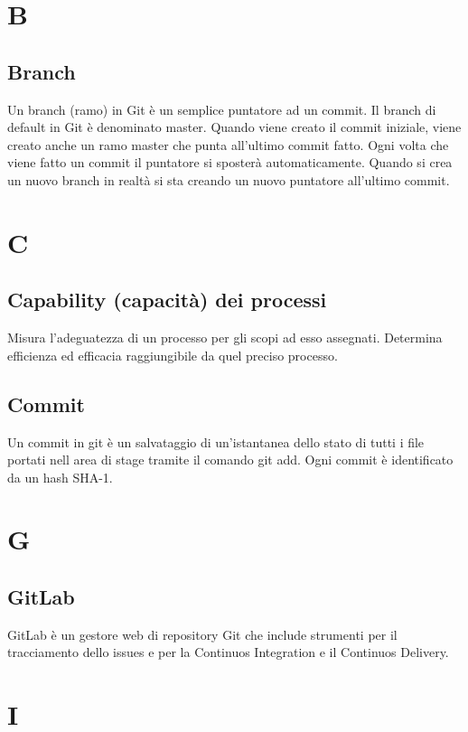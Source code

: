 \documentclass[11pt,a4paper]{article}
\begin{document}
	\section{B}
	\subsection{Branch}
	Un branch (ramo) in Git è un semplice puntatore ad un commit. Il branch di default in Git è denominato master. Quando viene creato il commit iniziale, viene creato anche un ramo master che punta all'ultimo commit fatto. Ogni volta che viene fatto un commit il puntatore si sposterà automaticamente. Quando si crea un nuovo branch in realtà si sta creando un nuovo puntatore all'ultimo commit.
	\section{C}
	\subsection{Capability (capacità) dei processi}
	Misura l'adeguatezza di un processo per gli scopi ad esso assegnati. Determina efficienza ed efficacia raggiungibile da quel preciso processo.
	\subsection{Commit}
	Un commit in git è un salvataggio di un'istantanea dello stato di tutti i file portati nell area di stage tramite il comando git add. Ogni commit è identificato da un hash SHA-1.
	\section{G}
	\subsection{GitLab}
	GitLab è un gestore web di repository Git che include strumenti per il tracciamento dello issues e per la Continuos Integration e il Continuos Delivery.
	\section{I}
\end{document}
